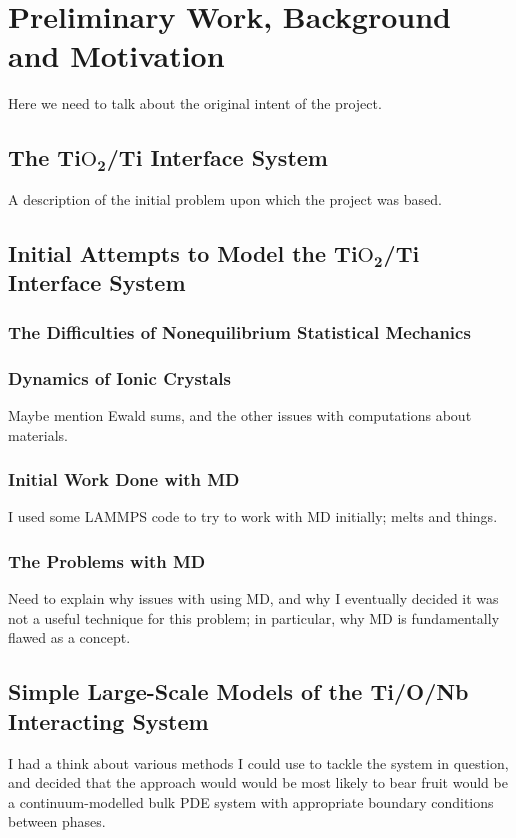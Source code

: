 \chapter{Preliminary Work, Background and Motivation}

Here we need to talk about the original intent of the project.

\section{The Ti$\text{O}_\mathbf{2}$/Ti Interface System}

A description of the initial problem upon which the project was based.

\section{Initial Attempts to Model the Ti$\text{O}_\mathbf{2}$/Ti Interface System}
\subsection{The Difficulties of Nonequilibrium Statistical Mechanics}
\subsection{Dynamics of Ionic Crystals}
Maybe mention Ewald sums, and the other issues with computations about materials.
\subsection{Initial Work Done with MD}
I used some LAMMPS code to try to work with MD initially; melts and things.
\subsection{The Problems with MD}
Need to explain why issues with using MD, and why I eventually decided it was not a useful technique for this problem; in particular, why MD is fundamentally flawed as a concept.

\section{Simple Large-Scale Models of the Ti/O/Nb Interacting System}
I had a think about various methods I could use to tackle the system in question, and decided that the approach would would be most likely to bear fruit would be a continuum-modelled bulk PDE system with appropriate boundary conditions between
phases.
